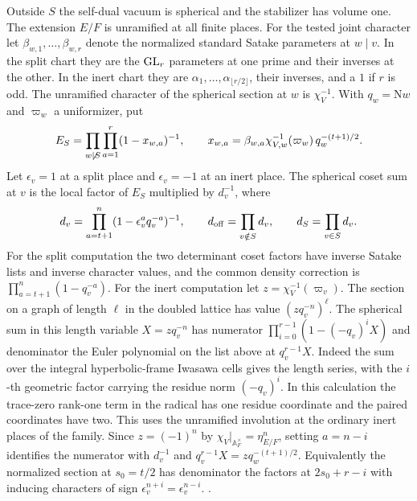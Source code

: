 Outside \(S\) the self-dual vacuum is spherical and the
stabilizer has volume one. The extension \(E/F\) is unramified
at all finite places. For the tested joint character let
\(\beta_{w,1},\ldots,\beta_{w,r}\) denote the normalized
standard Satake parameters at \(w\mid v\). In the split
chart they are the \({\rm GL}_r\) parameters at one prime and
their inverses at the other. In the inert chart they are
\(\alpha_1,\ldots,\alpha_{\lfloor r/2\rfloor}\), their inverses,
and a \(1\) if \(r\) is odd. The unramified character of the
spherical section at \(w\) is \(\chi_V^{-1}\).
With \(q_w=\mathrm Nw\) and \(\varpi_w\) a uniformizer, put
\[
 E_S=\prod_{w\not\mid S}\prod_{a=1}^r(1-x_{w,a})^{-1},
\qquad
 x_{w,a}=\beta_{w,a}\chi_{V,w}^{-1}(\varpi_w)\,
                         q_w^{-(t+1)/2}.
\]
Let \(\epsilon_v=1\) at a split place and \(\epsilon_v=-1\)
at an inert place. The spherical coset sum at \(v\) is the
local factor of \(E_S\) multiplied by \(d_v^{-1}\), where
\[
 d_v=\prod_{a=t+1}^{n}(1-\epsilon_v^a q_v^{-a})^{-1},
 \qquad d_{\rm off}=\prod_{v\notin S}d_v,\qquad
 d_S=\prod_{v\in S}d_v.
\]
For the split computation the two determinant coset factors
have inverse Satake lists and inverse character values, and the
common density correction is \(\prod_{a=t+1}^{n}(1-q_v^{-a})\).
For the inert computation let \(z=\chi_V^{-1}(\varpi_v)\).
The section on a graph of length \(\ell\) in the doubled
lattice has value \((zq_v^{-n})^\ell\). The spherical sum in
this length variable \(X=zq_v^{-n}\) has numerator
\(\prod_{i=0}^{r-1}(1-(-q_v)^iX)\) and denominator the
Euler polynomial on the list above at \(q_v^{r-1}X\).
Indeed the sum over the integral hyperbolic-frame Iwasawa
cells gives the length series, with the \(i\)-th geometric
factor carrying the residue norm \((-q_v)^i\). In this
calculation the trace-zero rank-one term in the radical has
one residue coordinate and the paired coordinates have two.
This uses the unramified involution at the ordinary inert places of the family. Since \(z=(-1)^n\) by
\(\chi_V|_{\mathbb A_F^\times}=\eta_{E/F}^n\), setting
\(a=n-i\) identifies the numerator with \(d_v^{-1}\) and
\(q_v^{r-1}X=zq_w^{-(t+1)/2}\).
Equivalently the normalized section at \(s_0=t/2\) has
denominator the factors at \(2s_0+r-i\) with inducing
characters of sign \(\epsilon_v^{n+i}=\epsilon_v^{n-i}\).
\cite[\S11.6]{gqt}
.

